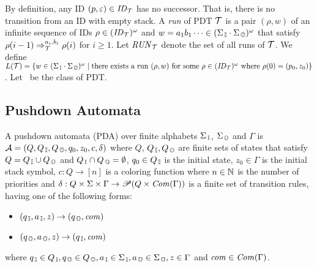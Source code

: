 By definition, any ID $(p, \varepsilon)\in\mathit{ID}_{{\cal T}}$ has
no successor.
That is, there is no transition from an ID with empty stack.
A {\em run} of PDT ${\cal T}$ is a pair $(\rho, w)$ of an infinite sequence of IDs $\rho\in (\mathit{ID}_{\cal T})^\omega$ and $w = a_1 b_1 \cdots \in (\Sigma_{\, \mathbb{I}}\cdot\Sigma_{\, \mathbb{O}})^\omega$ that satisfy $\rho(i-1)\Rightarrow_{\cal T}^{a_i, b_i}\rho(i)$ for $i\geq 1$.
Let $\mathit{RUN}_{\cal T}$ denote the set of all runs of ${\cal T}$.
We define $L({\cal T}) = \{w\in (\Sigma_{\, \mathbb{I}}\cdot\Sigma_{\, \mathbb{O}})^\omega\mid
\text{there exists a run}\allowbreak \text{ $(\rho, w)$ for some $\rho\in(\mathit{ID}_{\cal T})^\omega$ where $\rho(0)=(p_0, z_0)$}\}$.
Let \PDT\ be the class of PDT.


\subsection{Pushdown Automata}

\begin{definition}
A {pushdown automata} (PDA) over finite alphabets $\Sigma_{\, \mathbb{I}}$, $\Sigma_{\, \mathbb{O}}$ and $\Gamma$ is ${\cal A} = (Q, Q_{\, \mathbb{I}}, Q_{\, \mathbb{O}}, q_0, z_0, c, \delta)$ where
$Q$, $Q_{\, \mathbb{I}}, Q_{\, \mathbb{O}}$ are finite sets of states that satisfy $Q=Q_{\, \mathbb{I}}\cup Q_{\, \mathbb{O}}$ and $Q_{\, \mathbb{I}} \cap Q_{\, \mathbb{O}} = \emptyset$,
$q_0\in Q_{\, \mathbb{I}}$ is the initial state,
$z_0\in \Gamma$ is the initial stack symbol,
$c: Q \to [n]$ is a coloring function where $n\in \mathbb{N}$ is the number of priorities and
$\delta: Q \times \Sigma \times \Gamma \to \mathscr{P}(Q \times \mathit{Com}(\Gamma))$ is a finite set of transition rules, having one of the following forms:
\begin{itemize}
\item $(q_{\, \mathbb{I}}, a_{\, \mathbb{I}}, z) \rightarrow (q_{\, \mathbb{O}}, \mathit{com})$
\item $(q_{\, \mathbb{O}}, a_{\, \mathbb{O}}, z) \rightarrow (q_{\, \mathbb{I}}, \mathit{com})$
\end{itemize}
where $q_{\, \mathbb{I}}\in Q_{\, \mathbb{I}}, q_{\, \mathbb{O}}\in Q_{\, \mathbb{O}}, a_{\, \mathbb{I}}\in \Sigma_{\, \mathbb{I}}, a_{\, \mathbb{O}}\in \Sigma_{\, \mathbb{O}}, z\in \Gamma$ and $\mathit{com}\in \mathit{Com}(\Gamma)$.
\end{definition}

